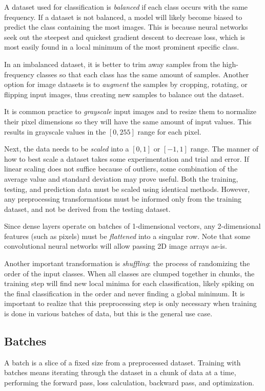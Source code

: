 \documentclass[a4paper]{article}
\begin{document}
A dataset used for classification is \emph{balanced} if each class occurs with the same frequency. If a dataset is not balanced, a model will likely become biased to predict the class containing the most images. This is because neural networks seek out the steepest and quickest gradient descent to decrease loss, which is most easily found in a local minimum of the most prominent specific class. 

In an imbalanced dataset, it is better to trim away samples from the high-frequency classes so that each class has the same amount of samples. Another option for image datasets is to \emph{augment} the samples by cropping, rotating, or flipping input images, thus creating new samples to balance out the dataset. 

It is common practice to \emph{grayscale} input images and to resize them to normalize their pixel dimensions so they will have the same amount of input values. This results in grayscale values in the $[0,255]$ range for each pixel.

Next, the data needs to be \emph{scaled} into a $[0,1]$ or $[-1,1]$ range. The manner of how to best scale a dataset takes some experimentation and trial and error. If linear scaling does not suffice because of outliers, some combination of the average value and standard deviation may prove useful. Both the training, testing, and prediction data must be scaled using identical methods. However, any preprocessing transformations must be informed only from the training dataset, and not be derived from the testing dataset. 

Since dense layers operate on batches of 1-dimensional vectors, any 2-dimensional features (such as pixels) must be \emph{flattened} into a singular row. Note that some convolutional neural networks will allow passing 2D image arrays as-is.

Another important transformation is \emph{shuffling}: the process of randomizing the order of the input classes. When all classes are clumped together in chunks, the training step will find new local minima for each classification, likely spiking on the final classification in the order and never finding a global minimum. It is important to realize that this preprocessing step is only necessary when training is done in various batches of data, but this is the general use case. 

\subsection*{Batches}
A batch is a slice of a fixed size from a preprocessed dataset. Training with batches means iterating through the dataset in a chunk of data at a time, performing the forward pass, loss calculation, backward pass, and optimization. 
\end{document}
